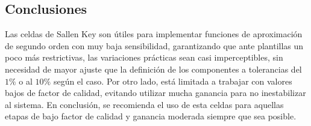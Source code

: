 \subsection{Conclusiones}
Las celdas de Sallen Key son \'utiles para implementar funciones de aproximaci\'on de segundo orden con muy baja sensibilidad, garantizando que ante plantillas un poco m\'as restrictivas, las variaciones
pr\'acticas sean casi imperceptibles, sin necesidad de mayor ajuste que la definici\'on de los componentes a tolerancias del $1\%$ o al $10\%$ seg\'un el caso. Por otro lado, est\'a limitada a trabajar con valores
bajos de factor de calidad, evitando utilizar mucha ganancia para no inestabilizar al sistema. En conclusi\'on, se recomienda el uso de esta celdas para aquellas etapas de bajo factor de calidad y ganancia moderada siempre
que sea posible.

